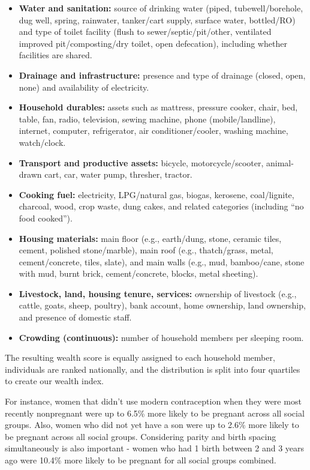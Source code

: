 \begin{itemize}
\item \textbf{Water and sanitation:} source of drinking water (piped, tubewell/borehole, dug well, spring, rainwater, tanker/cart supply, surface water, bottled/RO) and type of toilet facility (flush to sewer/septic/pit/other, ventilated improved pit/composting/dry toilet, open defecation), including whether facilities are shared.
\item \textbf{Drainage and infrastructure:} presence and type of drainage (closed, open, none) and availability of electricity.
\item \textbf{Household durables:} assets such as mattress, pressure cooker, chair, bed, table, fan, radio, television, sewing machine, phone (mobile/landline), internet, computer, refrigerator, air conditioner/cooler, washing machine, watch/clock.
\item \textbf{Transport and productive assets:} bicycle, motorcycle/scooter, animal-drawn cart, car, water pump, thresher, tractor.
\item \textbf{Cooking fuel:} electricity, LPG/natural gas, biogas, kerosene, coal/lignite, charcoal, wood, crop waste, dung cakes, and related categories (including “no food cooked”).
\item \textbf{Housing materials:} main floor (e.g., earth/dung, stone, ceramic tiles, cement, polished stone/marble), main roof (e.g., thatch/grass, metal, cement/concrete, tiles, slate), and main walls (e.g., mud, bamboo/cane, stone with mud, burnt brick, cement/concrete, blocks, metal sheeting).
\item \textbf{Livestock, land, housing tenure, services:} ownership of livestock (e.g., cattle, goats, sheep, poultry), bank account, home ownership, land ownership, and presence of domestic staff.
\item \textbf{Crowding (continuous):} number of household members per sleeping room.

\end{itemize}

The resulting wealth score is equally assigned to each household member, individuals are ranked nationally, and the distribution is split into four quartiles to create our wealth index.

For instance, women that didn't use modern contraception when they were most recently nonpregnant were up to 6.5\% more likely to be pregnant across all social groups. Also, women who did not yet have a son were up to 2.6\% more likely to be pregnant across all social groups. Considering parity and birth spacing simultaneously is also important - women who had 1 birth between 2 and 3 years ago were 10.4\% more likely to be pregnant for all social groups combined.

